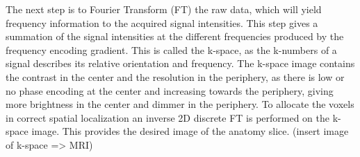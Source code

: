 The next step is to Fourier Transform (FT) the raw data, which will yield frequency information to the acquired signal intensities. This step gives a summation of the signal intensities at the different frequencies produced by the frequency encoding gradient. This is called the k-space, as the k-numbers of a signal describes its relative orientation and frequency. The k-space image contains the contrast in the center and the resolution in the periphery, as there is low or no phase encoding at the center and increasing towards the periphery, giving more brightness in the center and dimmer in the periphery. To allocate the voxels in correct spatial localization an inverse 2D discrete FT is performed on the k-space image. This provides the desired image of the anatomy slice.\cite{Bharath2008}
{\Large (insert image of k-space => MRI)} 
